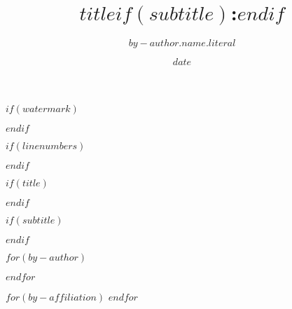 
\usepackage{etoolbox}


$if(watermark)$
  \usepackage[color={[gray]{0.97}}]{draftwatermark}
$endif$

$if(linenumbers)$
  \usepackage[left, displaymath, mathlines]{lineno}
  \linenumbers
$endif$


\providecommand{\keywords}[1]{\noindent\textbf{Keywords: }#1}

\providecommand{\targets}[1]{\noindent\textbf{Target Journal(s): }#1}

\providecommand{\correspond}[1]{
  \noindent Corresponding author email: \textit{#1}
}

\usepackage{authblk}
\renewcommand*{\Authsep}{, }
\renewcommand*{\Authand}{ and }
\renewcommand*{\Authands}{, and }
\renewcommand\Affilfont{\small\itshape}
\renewcommand\Authfont{\fontsize{12}{14.4}\selectfont}

\makeatletter
\renewcommand{\maketitle}{
  \setlength{\parindent}{0pt}
  \bgroup
  \begin{flushleft}
    \textbf{\Large{\@title}}
    \vskip 10pt
    \@author
    \vskip 10pt
    \textit{\small Draft compiled on \@date}
  \end{flushleft}
  \egroup
}
\makeatother

\setlength{\affilsep}{10pt}

$if(title)$
  \title{$title$$if(subtitle)$:$endif$}
$endif$

$if(subtitle)$
  \makeatletter
  \providecommand{\subtitle}[1]{%
    \apptocmd{\@title}{ #1 \par}{}{}
  }
  \makeatother
  \subtitle{$subtitle$}
$endif$

$for(by-author)$
\author[$for(it.affiliations)$$it.number$$sep$,$endfor$]{$by-author.name.literal$}
$endfor$

$for(by-affiliation)$
$endfor$

\date{$date$}

